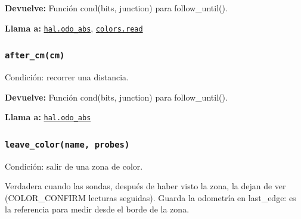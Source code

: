 \par{}\par\smallskip
\noindent\textbf{Devuelve:} Función cond(bits, junction) para follow\_until().\par
\noindent\textbf{Llama a:} \hyperref[fn:hal:odo-abs]{\texttt{hal.odo\_\allowbreak{}abs}}, \hyperref[fn:colors:read]{\texttt{colors.read}}\par

\subsubsection{\texttt{after\_\allowbreak{}cm(cm)}}\label{fn:linefollow:after-cm}
\noindent Condición: recorrer una distancia.

\par{}\par\smallskip
\noindent\textbf{Devuelve:} Función cond(bits, junction) para follow\_until().\par
\noindent\textbf{Llama a:} \hyperref[fn:hal:odo-abs]{\texttt{hal.odo\_\allowbreak{}abs}}\par

\subsubsection{\texttt{leave\_\allowbreak{}color(name, probes)}}\label{fn:linefollow:leave-color}
\noindent Condición: salir de una zona de color.

Verdadera cuando las sondas, después de haber visto la zona, la dejan de ver (COLOR\_CONFIRM lecturas seguidas). Guarda la odometría en last\_edge: es la referencia para medir desde el borde de la zona.

